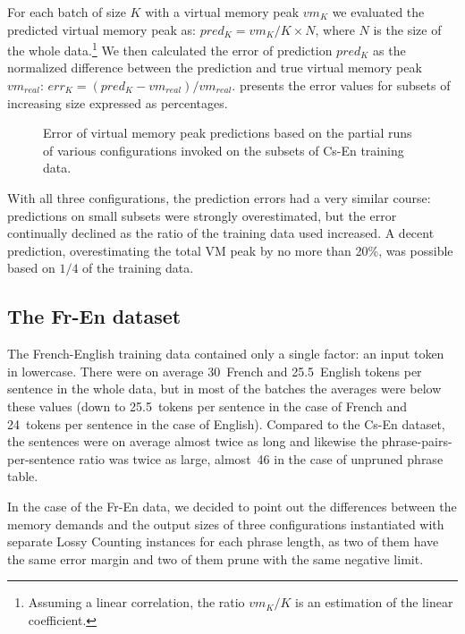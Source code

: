 For each batch of size $K$ with a virtual memory peak $vm_{K}$ we evaluated the predicted virtual
memory peak as: $pred_{K} = vm_{K} / K \times N$, where $N$ is the size of the whole
data.\footnote{Assuming a linear correlation, the ratio $vm_{K} / K$ is an estimation of the linear coefficient.}
We then calculated the error of prediction $pred_{K}$ as the normalized difference between
the prediction and true virtual memory peak $vm_{real}$: $err_{K} = (pred_{K} - vm_{real}) / vm_{real}$.
 presents the error values for subsets of increasing size
expressed as percentages.

\begin{figure}[!htb]
  \centering
  
  \caption{
    Error of virtual memory peak predictions based on the partial runs of various \eppex{} configurations
    invoked on the subsets of Cs-En training data.
  }
  \label{fig:cs-en-vm-peak-prediction}
\end{figure}

With all three configurations, the prediction errors had a very similar course: predictions on small
subsets were strongly overestimated, but the error continually declined as the ratio
of the training data used increased.
A decent prediction, overestimating the total VM peak by no more than 20\%, was possible based on $1/4$
of the training data.

\subsection{The Fr-En dataset}

The French-English training data contained only a single factor: an input token in lowercase.
There were on average 30~French and 25.5~English tokens per sentence in the whole data,
but in most of the batches the averages were below these values (down to 25.5~tokens
per sentence in the case of French and 24~tokens per sentence in the case of English).
Compared to the Cs-En dataset, the sentences were on average almost twice as long and
likewise the phrase-pairs-per-sentence ratio was twice as large, almost~46 in the case of
unpruned phrase table.

In the case of the Fr-En data, we decided to point out the differences between the memory demands
and the output sizes of three \eppex{} configurations instantiated with separate Lossy Counting
instances for each phrase length, as two of them have the same error margin and two of them
prune with the same negative limit.

